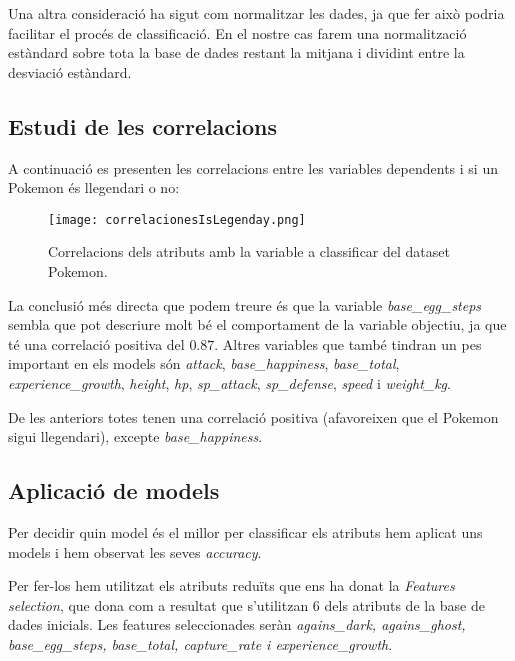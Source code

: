\documentclass[a4paper, 11pt]{article}
\begin{document}
    Una altra consideració ha sigut com normalitzar les dades, ja que fer això podria facilitar el procés de classificació. En el nostre cas farem una normalització estàndard sobre tota la base de dades restant la mitjana i dividint entre la desviació estàndard.

    \newpage
    \subsection{Estudi de les correlacions}

    A continuació es presenten les correlacions entre les variables dependents i si un Pokemon és
    llegendari o no:

    \begin{figure}[H]
        \centering
        \texttt{[image: correlacionesIsLegenday.png]}
        \caption{Correlacions dels atributs amb la variable a classificar del dataset Pokemon.}
    \end{figure}

    La conclusió més directa que podem treure és que la variable \textit{base\_egg\_steps}
    sembla que pot descriure molt bé el comportament de la variable objectiu, ja que té una
    correlació positiva del $0.87$. Altres variables que també tindran un pes important en
    els models són \textit{attack}, \textit{base\_happiness}, \textit{base\_total}, \textit{experience\_growth},
    \textit{height}, \textit{hp}, \textit{sp\_attack}, \textit{sp\_defense}, \textit{speed}
    i \textit{weight\_kg}.

    De les anteriors totes tenen una correlació positiva (afavoreixen que el Pokemon sigui llegendari), excepte \textit{base\_happiness}.

    \newpage
    \subsection{Aplicació de models}

    Per decidir quin model és el millor per classificar els atributs hem aplicat uns models i hem observat les seves \textit{accuracy}.

    Per fer-los hem utilitzat els atributs reduïts que ens ha donat la \textit{Features selection}, que dona com a resultat que s'utilitzan 6 dels atributs de la base de dades inicials. Les features seleccionades seràn \textit{agains\_dark, agains\_ghost,  base\_egg\_steps, base\_total, capture\_rate i experience\_growth}.
\end{document}
